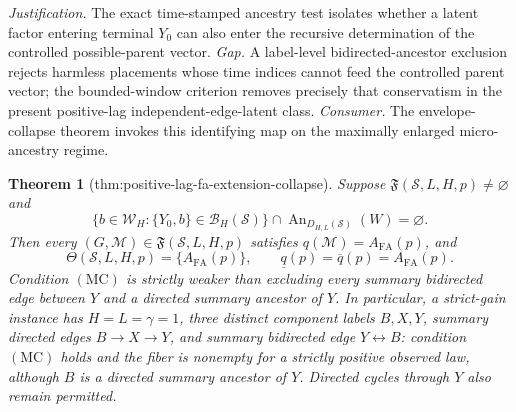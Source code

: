 \documentclass{article}
\newtheorem{theorem}{Theorem}
\begin{document}
\par\smallskip\noindent \textit{Justification.} The exact time-stamped ancestry test isolates whether a latent factor entering terminal \(Y_0\) can also enter the recursive determination of the controlled possible-parent vector. \textit{Gap.} A label-level bidirected-ancestor exclusion rejects harmless placements whose time indices cannot feed the controlled parent vector; the bounded-window criterion removes precisely that conservatism in the present positive-lag independent-edge-latent class. \textit{Consumer.} The envelope-collapse theorem invokes this identifying map on the maximally enlarged micro-ancestry regime.

\begin{theorem}[thm:positive-lag-fa-extension-collapse]\label{thm:positive-lag-fa-extension-collapse}
Suppose \(\mathfrak F(\mathcal S,L,H,p)\ne\varnothing\) and
\[
\bigl\{b\in\mathcal W_H:\{Y_0,b\}\in\mathcal B_H(\mathcal S)\bigr\}
\cap\operatorname{An}_{D_{H,L}(\mathcal S)}(W)=\varnothing.
\tag{MC}
\]
Then every \((G,\mathcal M)\in\mathfrak F(\mathcal S,L,H,p)\) satisfies \(q(\mathcal M)=A_{\mathrm{FA}}(p)\), and
\[
\Theta(\mathcal S,L,H,p)=\{A_{\mathrm{FA}}(p)\},
\qquad
\underline q(p)=\overline q(p)=A_{\mathrm{FA}}(p).
\]
Condition \(\mathrm{(MC)}\) is strictly weaker than excluding every summary bidirected edge between \(Y\) and a directed summary ancestor of \(Y\).  In particular, a strict-gain instance has \(H=L=\gamma=1\), three distinct component labels \(B,X,Y\), summary directed edges \(B\to X\to Y\), and summary bidirected edge \(Y\leftrightarrow B\): condition \(\mathrm{(MC)}\) holds and the fiber is nonempty for a strictly positive observed law, although \(B\) is a directed summary ancestor of \(Y\).  Directed cycles through \(Y\) also remain permitted.
\end{theorem}
\end{document}
